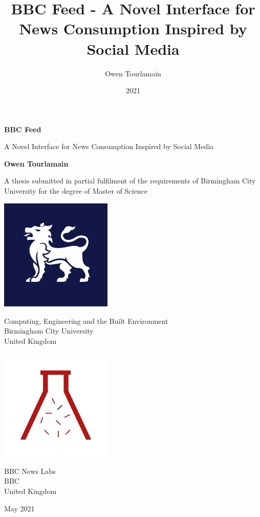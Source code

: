 \documentclass[12pt,titlepage]{article}
\title{BBC Feed - A Novel Interface for News Consumption Inspired by Social Media}
\date{2021}
\author{Owen Tourlamain}
\begin{document}
\begin{titlepage}
	\begin{center}
		\vspace*{1cm}

		\begingroup
      \fontsize{24}{30}\selectfont
      \textbf{BBC Feed}
    \endgroup

    \begingroup
      \fontsize{18}{22}\selectfont
      A Novel Interface for News Consumption Inspired by Social Media
    \endgroup

		\vspace{2cm}

		\textbf{Owen Tourlamain}

		\vfill

		A thesis submitted in partial fulfilment of the requirements of Birmingham City University for the degree of Master of Science

		\vspace{0.8cm}

    \begin{multicols}{2}

		\includegraphics[width=0.4\textwidth]{img/bcu.jpg}

		Computing, Engineering and the Built Environment\\
		Birmingham City University\\
		United Kingdom\\
    \columnbreak

    \includegraphics[width=0.4\textwidth]{img/bbcnl.jpg}

		BBC News Labs\\
		BBC\\
		United Kingdom\\

    \end{multicols}

    May 2021

	\end{center}
\end{titlepage}
\end{document}
